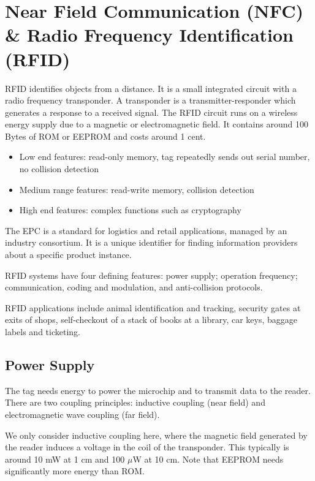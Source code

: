 \section[NFC \& RFID]{Near Field Communication (NFC) \& Radio Frequency Identification (RFID)}
\begin{mytitle}[RFID] RFID identifies objects from a distance. It is a small integrated circuit with a radio frequency transponder. A transponder is a transmitter-responder which generates a response to a received signal. The RFID circuit runs on a wireless energy supply due to a magnetic or electromagnetic field. It contains around 100 Bytes of ROM or EEPROM and costs around 1 cent.
\end{mytitle}
\begin{mytitle}\hfill
\begin{itemize}
    \item Low end features: read-only memory, tag repeatedly sends out serial number, no collision detection
    \item Medium range features: read-write memory, collision detection
    \item High end features: complex functions such as cryptography
\end{itemize}
\end{mytitle}
\begin{mytitle} The EPC is a standard for logistics and retail applications, managed by an industry consortium. It is a unique identifier for finding information providers about a specific product instance.
\end{mytitle}
\begin{mytitle} RFID systems have four defining features: power supply; operation frequency; communication, coding and modulation, and anti-collision protocols.
\end{mytitle}
\begin{mytitle} RFID applications include animal identification and tracking, security gates at exits of shops, self-checkout of a stack of books at a library, car keys, baggage labels and ticketing.
\end{mytitle}

\subsection{Power Supply}
\begin{mytitle} The tag needs energy to power the microchip and to transmit data to the reader. There are two coupling principles: inductive coupling (near field) and electromagnetic wave coupling (far field). 
\end{mytitle}
\begin{mytitle}
We only consider inductive coupling here, where the magnetic field generated by the reader induces a voltage in the coil of the transponder. This typically is around 10 mW at 1 cm and 100 $\mu$W at 10 cm. Note that EEPROM needs significantly more energy than ROM.
\end{mytitle}

